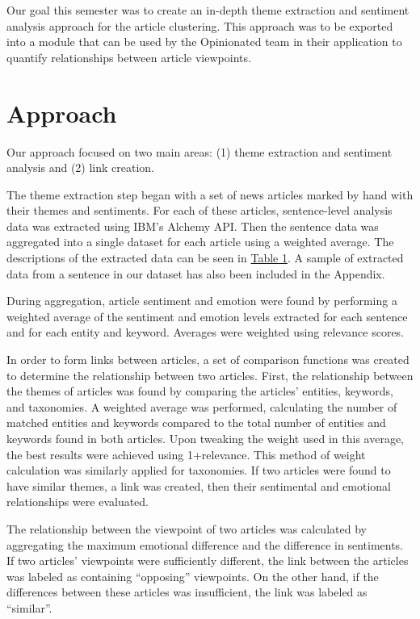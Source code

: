 \documentclass[12pt]{article}
\begin{document}
Our goal this semester was to create an in-depth theme extraction and sentiment analysis approach for the article clustering. This approach was to be exported into a module that can be used by the Opinionated team in their application to quantify relationships between article viewpoints.

\section{Approach}
Our approach focused on two main areas: (1) theme extraction and sentiment analysis and (2) link creation.

The theme extraction step began with a set of news articles marked by hand with their themes and sentiments. For each of these articles, sentence-level analysis data was extracted using IBM's Alchemy API. Then the sentence data was aggregated into a single dataset for each article using a weighted average. The descriptions of the extracted data can be seen in \hyperref[table:features]{Table 1}. A sample of extracted data from a sentence in our dataset has also been included in the Appendix.

During aggregation, article sentiment and emotion were found by performing a weighted average of the sentiment and emotion levels extracted for each sentence and for each entity and keyword. Averages were weighted using relevance scores.

In order to form links between articles, a set of comparison functions was created to determine the relationship between two articles. First, the relationship between the themes of articles was found by comparing the articles' entities, keywords, and taxonomies. A weighted average was performed, calculating the number of matched entities and keywords compared to the total number of entities and keywords found in both articles. Upon tweaking the weight used in this average, the best results were achieved using 1+relevance. This method of weight calculation was similarly applied for taxonomies. If two articles were found to have similar themes, a link was created, then their sentimental and emotional relationships were evaluated.

The relationship between the viewpoint of two articles was calculated by aggregating the maximum emotional difference and the difference in sentiments. If two articles' viewpoints were sufficiently different, the link between the articles was labeled as containing ``opposing'' viewpoints. On the other hand, if the differences between these articles was insufficient, the link was labeled as ``similar''.
\end{document}
